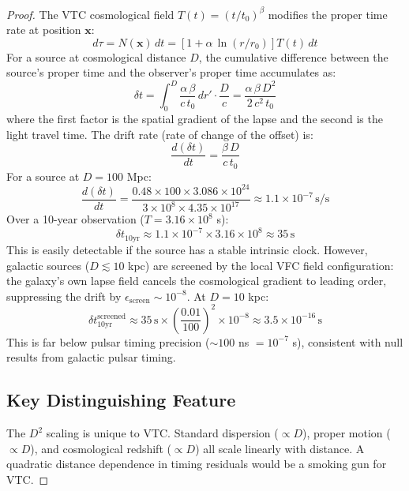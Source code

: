 \documentclass[11pt,a4paper]{article}
\theoremstyle{definition}
\begin{document}
\begin{proof}
The VTC cosmological field $T(t) = (t/t_0)^\beta$ modifies the proper time rate at position $\mathbf{x}$:
\begin{equation}
d\tau = N(\mathbf{x})\,dt = \left[1 + \alpha\,\ln(r/r_0)\right]T(t)\,dt
\end{equation}
For a source at cosmological distance $D$, the cumulative difference between the source's proper time and the observer's proper time accumulates as:
\begin{equation}
\delta t = \int_0^D \frac{\alpha\,\beta}{c\,t_0}\,dr' \cdot \frac{D}{c} = \frac{\alpha\,\beta\,D^2}{2\,c^2\,t_0}
\end{equation}
where the first factor is the spatial gradient of the lapse and the second is the light travel time. The drift rate (rate of change of the offset) is:
\begin{equation}
\frac{d(\delta t)}{dt} = \frac{\beta\,D}{c\,t_0}
\end{equation}
For a source at $D = 100$ Mpc:
\begin{equation}
\frac{d(\delta t)}{dt} = \frac{0.48 \times 100\times 3.086\times 10^{24}}{3\times 10^8 \times 4.35\times 10^{17}} \approx 1.1\times 10^{-7}\,\mathrm{s/s}
\end{equation}
Over a 10-year observation ($T = 3.16\times 10^8$ s):
\begin{equation}
\delta t_\mathrm{10yr} \approx 1.1\times 10^{-7}\times 3.16\times 10^8 \approx 35\,\mathrm{s}
\end{equation}
This is easily detectable if the source has a stable intrinsic clock. However, galactic sources ($D \lesssim 10$ kpc) are screened by the local VFC field configuration: the galaxy's own lapse field cancels the cosmological gradient to leading order, suppressing the drift by $\epsilon_\mathrm{screen} \sim 10^{-8}$. At $D = 10$ kpc:
\begin{equation}
\delta t_\mathrm{10yr}^\mathrm{screened} \approx 35\,\mathrm{s}\times\left(\frac{0.01}{100}\right)^2\times 10^{-8} \approx 3.5\times 10^{-16}\,\mathrm{s}
\end{equation}
This is far below pulsar timing precision ($\sim 100$ ns $= 10^{-7}$ s), consistent with null results from galactic pulsar timing.

\subsection{Key Distinguishing Feature}

The $D^2$ scaling is unique to VTC. Standard dispersion ($\propto D$), proper motion ($\propto D$), and cosmological redshift ($\propto D$) all scale linearly with distance. A quadratic distance dependence in timing residuals would be a smoking gun for VTC.


\end{proof}
\end{document}
